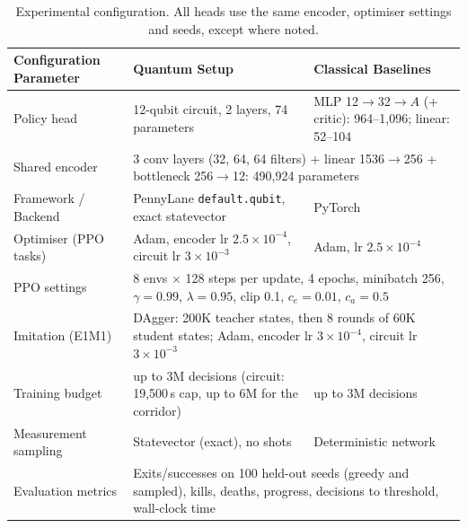 \documentclass[10pt, a4paper]{article}
\begin{document}
\begin{table}[htbp]
\centering
\footnotesize
\renewcommand{\arraystretch}{1.1}
\caption{Experimental configuration. All heads use the same encoder, optimiser settings and seeds, except where noted.}
\label{tab:experimental_setup}
\begin{tabularx}{\textwidth}{lXX}
\toprule
\textbf{Configuration Parameter} & \textbf{Quantum Setup} & \textbf{Classical Baselines} \\
\midrule
Policy head & 12-qubit circuit, 2 layers, 74 parameters & MLP 12$\to$32$\to A$ (+ critic): 964--1,096; linear: 52--104 \\
Shared encoder & \multicolumn{2}{p{0.74\textwidth}}{3 conv layers (32, 64, 64 filters) + linear 1536$\to$256 + bottleneck 256$\to$12: 490{,}924 parameters} \\
Framework / Backend & PennyLane \texttt{default.qubit}, exact statevector & PyTorch \\
Optimiser (PPO tasks) & Adam, encoder lr $2.5\times10^{-4}$, circuit lr $3\times10^{-3}$ & Adam, lr $2.5\times10^{-4}$ \\
PPO settings & \multicolumn{2}{p{0.74\textwidth}}{8 envs $\times$ 128 steps per update, 4 epochs, minibatch 256, $\gamma=0.99$, $\lambda=0.95$, clip 0.1, $c_e=0.01$, $c_a=0.5$} \\
Imitation (E1M1) & \multicolumn{2}{p{0.74\textwidth}}{DAgger: 200K teacher states, then 8 rounds of 60K student states; Adam, encoder lr $3\times10^{-4}$, circuit lr $3\times10^{-3}$} \\
Training budget & up to 3M decisions (circuit: 19{,}500\,s cap, up to 6M for the corridor) & up to 3M decisions \\
Measurement sampling & Statevector (exact), no shots & Deterministic network \\
Evaluation metrics & \multicolumn{2}{p{0.74\textwidth}}{Exits/successes on 100 held-out seeds (greedy and sampled), kills, deaths, progress, decisions to threshold, wall-clock time} \\
\bottomrule
\end{tabularx}
\end{table}
\end{document}

